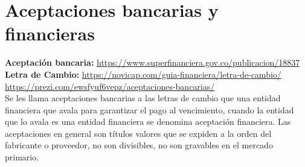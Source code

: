 
\vspace{-\baselineskip}
\noindent
	\section{Aceptaciones bancarias y financieras}
	\textbf{Aceptación bancaria:} \href{https://www.superfinanciera.gov.co/publicacion/18837}{https://www.superfinanciera.gov.co/publicacion/18837}\\
	\textbf{Letra de Cambio:} \href{https://novicap.com/guia-financiera/letra-de-cambio/}{https://novicap.com/guia-financiera/letra-de-cambio/}\\
	\href{https://prezi.com/ewsfyuf6vepz/aceptaciones-bancarias/}{https://prezi.com/ewsfyuf6vepz/aceptaciones-bancarias/}\\
	
	Se les llama aceptaciones bancarias a las letras de cambio que una entidad financiera que avala para garantizar el pago al vencimiento, cuando la entidad que lo avala es una entidad financiera se denomina aceptación financiera. Las aceptaciones en general son títulos valores que se expiden a la orden del fabricante o proveedor, no son divisibles, no son gravables en el mercado primario.















